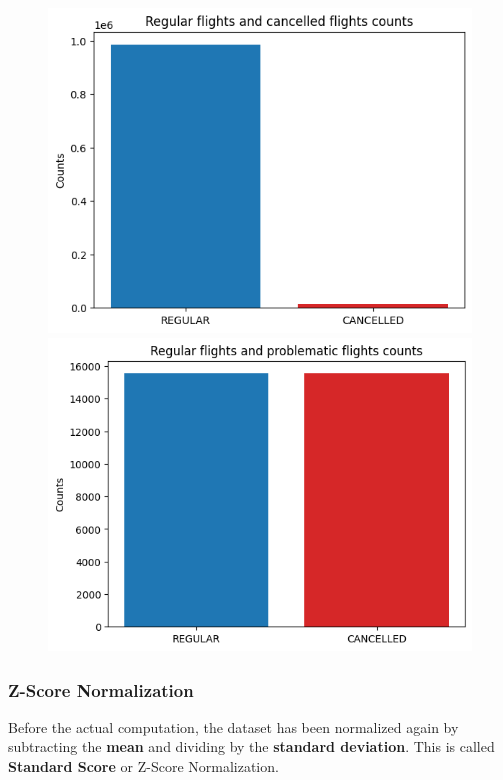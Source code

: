 \documentclass[
	letterpaper, %
	10pt, %
]{class}
\begin{document}
\begin{figure}[!htb]
    \centering
      \includegraphics[width=\linewidth]{../images/cancelled_unbalanced.png}
    \endminipage\hfill
      \includegraphics[width=\linewidth]{../images/cancelled_balanced.png}
    \endminipage\hfill
\end{figure}

\subsubsection{Z-Score Normalization}
Before the actual computation, the dataset has been normalized again by subtracting the \textbf{mean} and dividing by the \textbf{standard deviation}. This is called \textbf{Standard Score} \cite{normalization} or Z-Score Normalization.\\
\end{document}
